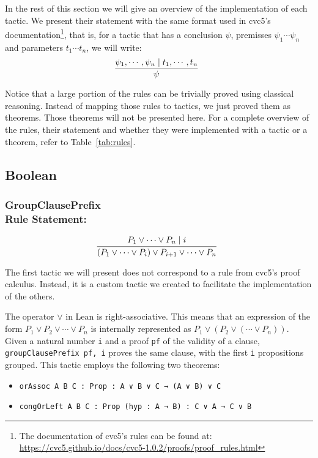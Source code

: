 In the rest of this section we will give an overview of the implementation of each tactic.
We present their statement with the same format used in cvc5's documentation\footnote{The documentation of cvc5's rules can be found at:
  \url{https://cvc5.github.io/docs/cvc5-1.0.2/proofs/proof_rules.html}}, that is,
for a tactic that has a conclusion $\psi$, premisses $\psi_{1} \cdots \psi_{n}$ and
parameters $t_{1} \cdots t_{n}$, we will write:
\[
  \infer[]{\psi}{\psi_{1}, \cdots, \psi_{n} \mid t_{1}, \cdots, t_{n}}
\]

Notice that a large portion of the rules can be trivially proved using classical
reasoning. Instead of mapping those rules to tactics, we just proved them as theorems.
Those theorems will not be presented here. For a complete overview of the rules, their statement and whether they were implemented with a tactic or a
theorem, refer to Table~\ref{tab:rules}.

\subsection{Boolean}

\subsubsection*{GroupClausePrefix\\Rule Statement:}
\[
  \infer[]{(P_{1} \vee \cdots \vee P_{i}) \vee P_{i + 1} \vee \cdots \vee P_{n}}
    {P_{1} \vee \cdots \vee P_{n} \mid i}
\]

The first tactic we will present does not correspond to a rule from cvc5's proof
calculus. Instead, it is a custom tactic we created to facilitate the implementation
of the others.

The operator $\vee$ in Lean is right-associative. This means that an expression of the form
$P_{1} \vee P_{2} \vee \cdots \vee P_{n}$ is internally represented as
$P_{1} \vee (P_{2} \vee (\cdots \vee P_{n}))$.
Given a natural number \texttt{i} and a proof \texttt{pf}
of the validity of a clause, \texttt{groupClausePrefix pf, i} proves the same clause, with the
first \texttt{i} propositions grouped. This tactic employs the following two theorems:

\begin{itemize}
  \item \texttt{orAssoc {A B C : Prop} : A ∨ B ∨ C → (A ∨ B) ∨ C}
  \item \texttt{congOrLeft {A B C : Prop} (hyp : A → B) : C ∨ A → C ∨ B}
\end{itemize}

